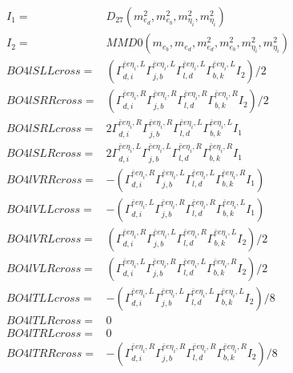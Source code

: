 \documentclass[A4,landscape]{article}
\begin{document}
\begin{align} 
I_1 = & D_{27}(m^2_{e_{{d}}}, m^2_{e_{{b}}}, m^2_{\eta_i}, m^2_{\eta_i}) \\ 
I_2 = & MMD0(m_{e_{{b}}}, m_{e_{{d}}}, m^2_{e_{{d}}}, m^2_{e_{{b}}}, m^2_{\eta_i}, m^2_{\eta_i}) \\ 
  BO4lSLLcross= & ( \Gamma^{\bar{e}e \eta_i ,L}_{d, i} \Gamma^{\bar{e}e \eta_i ,L}_{j, b} \Gamma^{\bar{e}e \eta_i ,L}_{l, d} \Gamma^{\bar{e}e \eta_i ,L}_{b, k} I_2)/2 \\ 
  BO4lSRRcross= & ( \Gamma^{\bar{e}e \eta_i ,R}_{d, i} \Gamma^{\bar{e}e \eta_i ,R}_{j, b} \Gamma^{\bar{e}e \eta_i ,R}_{l, d} \Gamma^{\bar{e}e \eta_i ,R}_{b, k} I_2)/2 \\ 
  BO4lSRLcross= & 2  \Gamma^{\bar{e}e \eta_i ,R}_{d, i} \Gamma^{\bar{e}e \eta_i ,R}_{j, b} \Gamma^{\bar{e}e \eta_i ,L}_{l, d} \Gamma^{\bar{e}e \eta_i ,L}_{b, k} I_1 \\ 
  BO4lSLRcross= & 2  \Gamma^{\bar{e}e \eta_i ,L}_{d, i} \Gamma^{\bar{e}e \eta_i ,L}_{j, b} \Gamma^{\bar{e}e \eta_i ,R}_{l, d} \Gamma^{\bar{e}e \eta_i ,R}_{b, k} I_1 \\ 
  BO4lVRRcross= & -( \Gamma^{\bar{e}e \eta_i ,R}_{d, i} \Gamma^{\bar{e}e \eta_i ,L}_{j, b} \Gamma^{\bar{e}e \eta_i ,L}_{l, d} \Gamma^{\bar{e}e \eta_i ,R}_{b, k} I_1) \\ 
  BO4lVLLcross= & -( \Gamma^{\bar{e}e \eta_i ,L}_{d, i} \Gamma^{\bar{e}e \eta_i ,R}_{j, b} \Gamma^{\bar{e}e \eta_i ,R}_{l, d} \Gamma^{\bar{e}e \eta_i ,L}_{b, k} I_1) \\ 
  BO4lVRLcross= & ( \Gamma^{\bar{e}e \eta_i ,R}_{d, i} \Gamma^{\bar{e}e \eta_i ,L}_{j, b} \Gamma^{\bar{e}e \eta_i ,R}_{l, d} \Gamma^{\bar{e}e \eta_i ,L}_{b, k} I_2)/2 \\ 
  BO4lVLRcross= & ( \Gamma^{\bar{e}e \eta_i ,L}_{d, i} \Gamma^{\bar{e}e \eta_i ,R}_{j, b} \Gamma^{\bar{e}e \eta_i ,L}_{l, d} \Gamma^{\bar{e}e \eta_i ,R}_{b, k} I_2)/2 \\ 
  BO4lTLLcross= & -( \Gamma^{\bar{e}e \eta_i ,L}_{d, i} \Gamma^{\bar{e}e \eta_i ,L}_{j, b} \Gamma^{\bar{e}e \eta_i ,L}_{l, d} \Gamma^{\bar{e}e \eta_i ,L}_{b, k} I_2)/8 \\ 
  BO4lTLRcross= & 0 \\ 
  BO4lTRLcross= & 0 \\ 
  BO4lTRRcross= & -( \Gamma^{\bar{e}e \eta_i ,R}_{d, i} \Gamma^{\bar{e}e \eta_i ,R}_{j, b} \Gamma^{\bar{e}e \eta_i ,R}_{l, d} \Gamma^{\bar{e}e \eta_i ,R}_{b, k} I_2)/8 \\ 
\end{align} 
\end{document}
